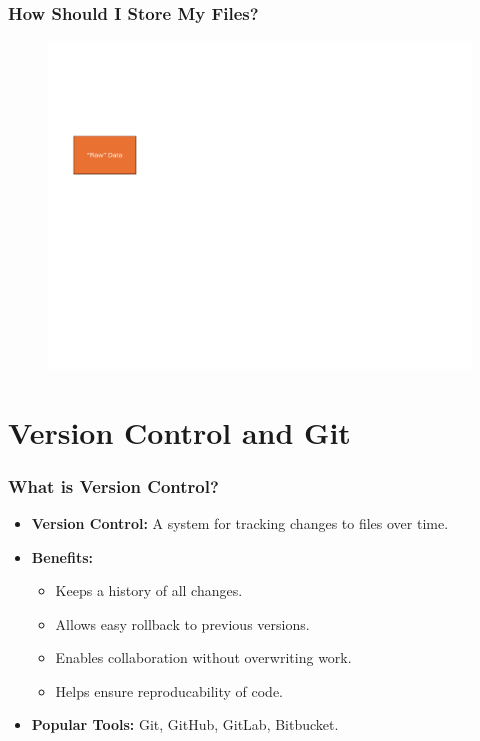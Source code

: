 \documentclass{beamer}
\begin{document}
\begin{frame}
    \frametitle{How Should I Store My Files?}

    \begin{figure}
        \centering
        \includegraphics[width=1\textwidth,page=9]{workflow_figs.pdf}
    \end{figure}

\end{frame}


\section{Version Control and Git}
\label{sec:git}


\begin{frame}
    \frametitle{What is Version Control?}

\begin{itemize}
    \item \textbf{Version Control:} A system for tracking changes to files over time.
    \item \textbf{Benefits:}
    \begin{itemize}
        \item Keeps a history of all changes.
        \item Allows easy rollback to previous versions.
        \item Enables collaboration without overwriting work.
        \item Helps ensure reproducability of code.
    \end{itemize}
    \item \textbf{Popular Tools:} Git, GitHub, GitLab, Bitbucket.
\end{itemize}

\end{frame}
\end{document}

